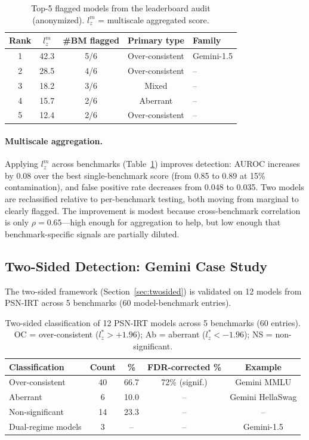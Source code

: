 \documentclass[11pt,a4paper]{article}
\begin{document}
\begin{table}[t]
\centering
\caption{Top-5 flagged models from the leaderboard audit (anonymized). $l_z^m$ = multiscale aggregated score.}
\label{tab:top_flagged}
\small
\begin{tabular}{c c c c l}
\toprule
Rank & $l_z^m$ & \#BM flagged & Primary type & Family \\
\midrule
1 & 42.3 & 5/6 & Over-consistent & Gemini-1.5 \\
2 & 28.5 & 4/6 & Over-consistent & -- \\
3 & 18.2 & 3/6 & Mixed & -- \\
4 & 15.7 & 2/6 & Aberrant & -- \\
5 & 12.4 & 2/6 & Over-consistent & -- \\
\bottomrule
\end{tabular}
\end{table}

\paragraph{Multiscale aggregation.} Applying $l_z^m$ across benchmarks (Table~\ref{tab:top_flagged}) improves detection: AUROC increases by 0.08 over the best single-benchmark score (from 0.85 to 0.89 at 15\% contamination), and false positive rate decreases from 0.048 to 0.035. Two models are reclassified relative to per-benchmark testing, both moving from marginal to clearly flagged. The improvement is modest because cross-benchmark correlation is only $\rho=0.65$---high enough for aggregation to help, but low enough that benchmark-specific signals are partially diluted.

\subsection{Two-Sided Detection: Gemini Case Study}

The two-sided framework (Section~\ref{sec:twosided}) is validated on 12 models from PSN-IRT across 5 benchmarks (60 model-benchmark entries).

\begin{table}[t]
\centering
\caption{Two-sided classification of 12 PSN-IRT models across 5 benchmarks (60 entries). OC = over-consistent ($l_z^* > +1.96$); Ab = aberrant ($l_z^* < -1.96$); NS = non-significant.}
\label{tab:twosided}
\small
\begin{tabular}{l c c c c}
\toprule
Classification & Count & \% & FDR-corrected \% & Example \\
\midrule
Over-consistent & 40 & 66.7 & 72\% (signif.) & Gemini MMLU \\
Aberrant & 6 & 10.0 & -- & Gemini HellaSwag \\
Non-significant & 14 & 23.3 & -- & -- \\
\midrule
Dual-regime models & 3 & -- & -- & Gemini-1.5 \\
\bottomrule
\end{tabular}
\end{table}
\end{document}
